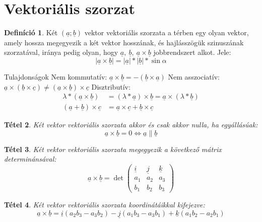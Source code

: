 \documentclass[twoside,12pt]{report}
\renewcommand{\vec}{\underline}
\newtheorem{theorem}{Tétel}[section]
\theoremstyle{definition}
\newtheorem{definition}[theorem]{Definíció}
\begin{document}
\section{Vektoriális szorzat}
	\begin{definition}
		Két $(\vec{a};\vec{b})$ vektor vektoriális szorzata a térben egy olyan vektor, amely hossza megegyezik a két vektor hosszának, és hajlásszögük szinuszának szorzatával, iránya pedig olyan, hogy $\vec{a},\ \vec{b},\ \vec{a}\times\vec{b}$ jobbrendszert alkot. Jele:
		\begin{equation*}
			|\vec{a}\times\vec{b}|=|\vec{a}|*|\vec{b}|*\sin\alpha
		\end{equation*}
	\end{definition}
	\begin{outline}
		\1 Tulajdonságok
			\2 Nem kommutatív: $\vec{a}\times\vec{b}=-(\vec{b}\times\vec{a})$
			\2 Nem asszociatív: $\vec{a}\times(\vec{b}\times\vec{c})\ne (\vec{a}\times\vec{b})\times\vec{c}$
			\2 Disztributív:
			\begin{align*}
				\lambda*(\vec{a}\times\vec{b})&=(\lambda*\vec{a})\times\vec{b}=\vec{a}\times(\lambda*\vec{b})\\
				(\vec{a}+\vec{b})\times\vec{c}&=\vec{a}\times\vec{c}+\vec{b}\times\vec{c}
			\end{align*}
	\end{outline}
	\begin{theorem}
		Két vektor vektoriális szorzata akkor és csak akkor nulla, ha egyállásúak:
		\begin{equation*}
			\vec{a}\times\vec{b}=0\Leftrightarrow\vec{a}\|\vec{b}
		\end{equation*}
	\end{theorem}
	\begin{theorem}
		Két vektor vektoriális szorzata megegyezik a következő mátrix determinánsával:
		\begin{equation*}
			\vec{a}\times\vec{b}=\det
			\begin{pmatrix}
				\vec{i}&\vec{j}&\vec{k}\\
				a_1&a_2&a_3\\
				b_1&b_2&b_3
			\end{pmatrix}
		\end{equation*}
	\end{theorem}
	\begin{theorem}
		Két vektor vektoriális szorzata koordinátáikkal kifejezve:
		\begin{equation*}
			\vec{a}\times\vec{b}=\vec{i}(a_2b_3-a_3b_2)-\vec{j}(a_1b_3-a_3b_1)+\vec{k}(a_1b_2-a_2b_1)
		\end{equation*}
	\end{theorem}
\end{document}
